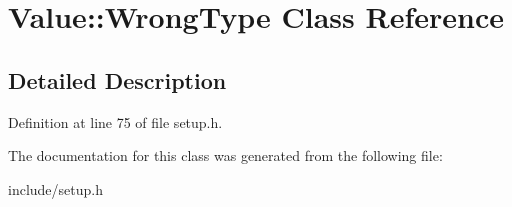 \hypertarget{classValue_1_1WrongType}{\section{Value\-:\-:Wrong\-Type Class Reference}
\label{classValue_1_1WrongType}
}


\subsection{Detailed Description}


Definition at line 75 of file setup.\-h.



The documentation for this class was generated from the following file\-:\begin{DoxyCompactItemize}
\item 
include/setup.\-h\end{DoxyCompactItemize}
